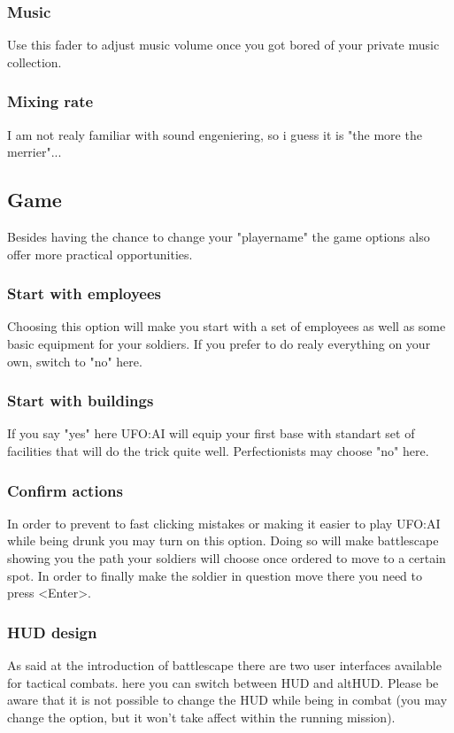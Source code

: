 \subsubsection*{Music}
Use this fader to adjust music volume once you got bored of your private music collection.
\subsubsection*{Mixing rate}
I am not realy familiar with sound engeniering, so i guess it is "the more the merrier"...

\subsection{Game}
Besides having the chance to change your "playername" the game options also offer more practical opportunities.
\subsubsection*{Start with employees}
Choosing this option will make you start with a set of employees as well as some basic equipment for your soldiers. If you prefer to do realy everything on your own, switch to "no" here.
\subsubsection*{Start with buildings}
If you say "yes" here UFO:AI will equip your first base with standart set of facilities that will do the trick quite well. Perfectionists may choose "no" here.
\subsubsection*{Confirm actions}
In order to prevent to fast clicking mistakes or making it easier to play UFO:AI while being drunk you may turn on this option. Doing so will make battlescape showing you the path your soldiers will choose once ordered to move to a certain spot. In order to finally make the soldier in question move there you need to press <Enter>.
\subsubsection*{HUD design}
As said at the introduction of battlescape there are two user interfaces available for tactical combats. here you can switch between HUD and altHUD. Please be aware that it is not possible to change the HUD while being in combat (you may change the option, but it won't take affect within the running mission).
